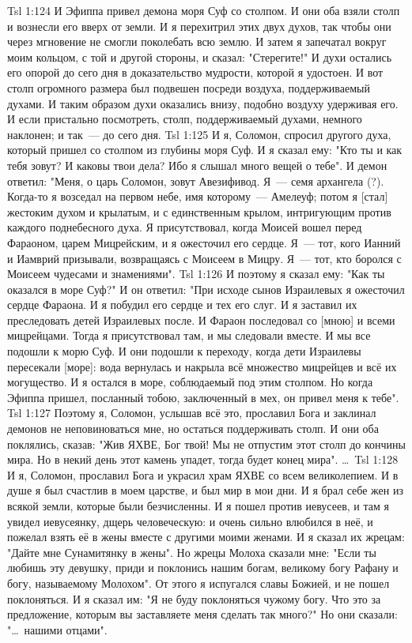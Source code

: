 \vs Tsl 1:124 
И Эфиппа привел демона моря Суф со столпом. И они оба взяли столп и вознесли его вверх от земли. И я перехитрил этих двух духов, так чтобы они через мгновение не смогли поколебать всю землю. И затем я запечатал вокруг моим кольцом, с той и другой стороны, и сказал: "Стерегите!" И духи остались его опорой до сего дня в доказательство мудрости, которой я удостоен. И вот столп огромного размера был подвешен посреди воздуха, поддерживаемый духами. И таким образом духи оказались внизу, подобно воздуху удерживая его. И если пристально посмотреть, столп, поддерживаемый духами, немного наклонен; и так~--- до сего дня.
\vs Tsl 1:125 
И я, Соломон, спросил другого духа, который пришел со столпом из глубины моря Суф. И я сказал ему: "Кто ты и как тебя зовут? И каковы твои дела? Ибо я слышал много вещей о тебе". И демон ответил: "Меня, о царь Соломон, зовут Авезифивод. Я~--- семя архангела (?). Когда-то я возседал на первом небе, имя которому~--- Амелеуф; потом я [стал] жестоким духом и крылатым, и с единственным крылом, интригующим против каждого поднебесного духа. Я присутствовал, когда Моисей вошел перед Фараоном, царем Мицрейским, и я ожесточил его сердце. Я~--- тот, кого Ианний и Иамврий призывали, возвращаясь с Моисеем в Мицру. Я~--- тот, кто боролся с Моисеем чудесами и знамениями".
\vs Tsl 1:126 
И поэтому я сказал ему: "Как ты оказался в море Суф?" И он ответил: "При исходе сынов Израилевых я ожесточил сердце Фараона. И я побудил его сердце и тех его слуг. И я заставил их преследовать детей Израилевых после. И Фараон последовал со [мною] и всеми мицрейцами. Тогда я присутствовал там, и мы следовали вместе. И мы все подошли к морю Суф. И они подошли к переходу, когда дети Израилевы пересекали [море]: вода вернулась и накрыла всё множество мицрейцев и всё их могущество. И я остался в море, соблюдаемый под этим столпом. Но когда Эфиппа пришел, посланный тобою, заключенный в мех, он привел меня к тебе".
\vs Tsl 1:127 
Поэтому я, Соломон, услышав всё это, прославил Бога и заклинал демонов не неповиноваться мне, но остаться поддерживать столп. И они оба поклялись, сказав: "Жив ЯХВЕ, Бог твой! Мы не отпустим этот столп до кончины мира. Но в некий день этот камень упадет, тогда будет конец мира". \ldots\ 
\vs Tsl 1:128 
И я, Соломон, прославил Бога и украсил храм ЯХВЕ со всем великолепием. И в душе я был счастлив в моем царстве, и был мир в мои дни. И я брал себе жен из всякой земли, которые были безчисленны. И я пошел против иевусеев, и там я увидел иевусеянку, дщерь человеческую: и очень сильно влюбился в неё, и пожелал взять её в жены вместе с другими моими женами. И я сказал их жрецам: "Дайте мне Сунамитянку в жены". Но жрецы Молоха сказали мне: "Если ты любишь эту девушку, приди и поклонись нашим богам, великому богу Рафану и богу, называемому Молохом". От этого я испугался славы Божией, и не пошел поклоняться. И я сказал им: "Я не буду поклоняться чужому богу. Что это за предложение, которым вы заставляете меня сделать так много?" Но они сказали: "\ldots\ нашими отцами".
